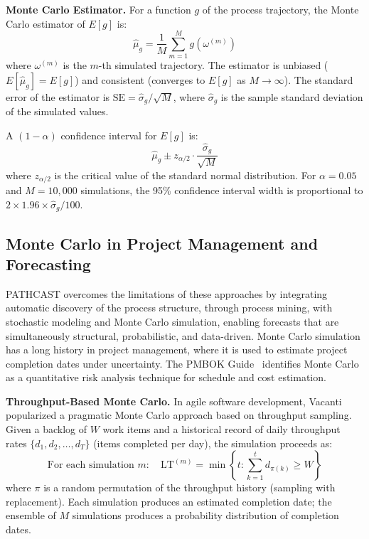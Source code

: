\textbf{Monte Carlo Estimator.} For a function $g$ of the process
trajectory, the Monte Carlo estimator of $E[g]$ is:
\begin{equation}
\label{eq:mc-estimator}
\hat{\mu}_g = \frac{1}{M} \sum_{m=1}^{M} g(\omega^{(m)})
\end{equation}
where $\omega^{(m)}$ is the $m$-th simulated trajectory. The estimator
is unbiased ($E[\hat{\mu}_g] = E[g]$) and consistent (converges to
$E[g]$ as $M \to \infty$). The standard error of the estimator is
$\text{SE} = \hat{\sigma}_g / \sqrt{M}$, where $\hat{\sigma}_g$ is the
sample standard deviation of the simulated values.

A $(1-\alpha)$ confidence interval for $E[g]$ is:
\begin{equation}
\label{eq:mc-ci}
\hat{\mu}_g \pm z_{\alpha/2} \cdot \frac{\hat{\sigma}_g}{\sqrt{M}}
\end{equation}
where $z_{\alpha/2}$ is the critical value of the standard normal
distribution. For $\alpha = 0.05$ and $M = 10{,}000$ simulations, the
95\% confidence interval width is proportional to
$2 \times 1.96 \times \hat{\sigma}_g / 100$.


\subsection{Monte Carlo in Project Management and Forecasting}
\label{sec:mc-project}
PATHCAST overcomes the limitations of these approaches by integrating automatic discovery of the process structure, through process mining, with stochastic modeling and Monte Carlo simulation, enabling forecasts that are simultaneously structural, probabilistic, and data-driven.
Monte Carlo simulation has a long history in project management, where
it is used to estimate project completion dates under uncertainty. The
PMBOK Guide~\cite{pmi2017pmbok} identifies Monte Carlo as a quantitative
risk analysis technique for schedule and cost estimation.

\textbf{Throughput-Based Monte Carlo.} In agile software development,
Vacanti~\cite{vacanti2015} popularized a pragmatic Monte Carlo
approach based on throughput sampling. Given a backlog of $W$ work items
and a historical record of daily throughput rates
$\{d_1, d_2, \ldots, d_T\}$ (items completed per day), the simulation
proceeds as:
\begin{equation}
\label{eq:vacanti-mc}
\text{For each simulation } m: \quad
\text{LT}^{(m)} = \min\left\{ t : \sum_{k=1}^{t} d_{\pi(k)} \geq W \right\}
\end{equation}
where $\pi$ is a random permutation of the throughput history (sampling
with replacement). Each simulation produces an estimated completion date;
the ensemble of $M$ simulations produces a probability distribution of
completion dates.


